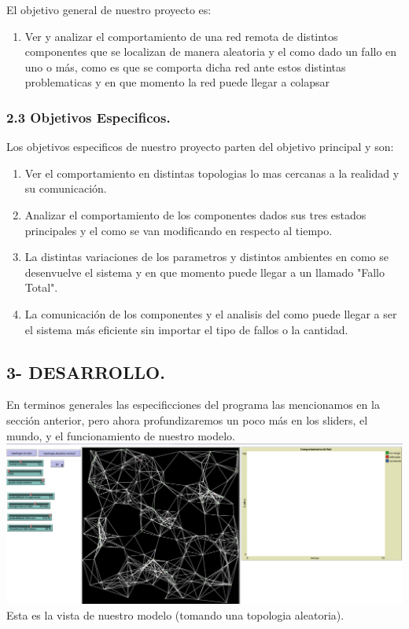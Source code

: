\documentclass[12pt]{article}
\begin{document}
El objetivo general de nuestro proyecto es:\\

\begin{enumerate}
    \item Ver y analizar el comportamiento de una red remota de distintos componentes que se localizan de manera aleatoria y el como dado un fallo en uno o más, como es que se comporta dicha red ante estos distintas
    problematicas y en que momento la red puede llegar a colapsar 
\end{enumerate}

{\color{red} \subsubsection*{2.3 Objetivos Especificos.}}
\vspace{1em}

Los objetivos especificos de nuestro proyecto parten del objetivo principal y son:\\
\begin{enumerate}
    \item Ver el comportamiento en distintas topologias lo mas cercanas a la realidad y su comunicación.
    \item Analizar el comportamiento de los componentes dados sus tres estados principales y el como se van modificando en respecto al tiempo.
    \item La distintas variaciones de los parametros y distintos ambientes en como se desenvuelve el sistema y en que momento puede llegar a un llamado "Fallo Total".
    \item La comunicación de los componentes y el analisis del como puede llegar a ser el sistema más eficiente sin importar el tipo de fallos o la cantidad.
\end{enumerate}


{\color{blue} \subsection*{3- DESARROLLO.}}
\vspace{1em}

En terminos generales las especificciones del programa las mencionamos en la sección anterior, pero ahora profundizaremos un poco más en los sliders, el mundo, y el funcionamiento de nuestro modelo.\\

\textbf{\includegraphics[scale = 0.30]{images/vista-general.png}}\\
Esta es la vista de nuestro modelo (tomando una topologia aleatoria).\\
\end{document}
